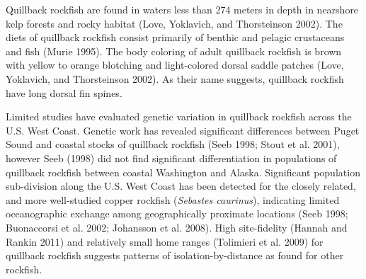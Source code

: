\documentclass[11pt,
  english,
  a4paper,
]{article}
\begin{document}
\leavevmode\tagmcend\tagstructend\par


Quillback rockfish are found in waters less than 274 meters in depth in nearshore kelp forests and rocky habitat {(Love, Yoklavich, and Thorsteinson 2002)\leavevmode\tagmcend\tagstructend}. The diets of quillback rockfish consist primarily of benthic and pelagic crustaceans and fish {(Murie 1995)\leavevmode\tagmcend\tagstructend}. The body coloring of adult quillback rockfish is brown with yellow to orange blotching and light-colored dorsal saddle patches {(Love, Yoklavich, and Thorsteinson 2002)\leavevmode\tagmcend\tagstructend}. As their name suggests, quillback rockfish have long dorsal fin spines.

\leavevmode\tagmcend\tagstructend\par


Limited studies have evaluated genetic variation in quillback rockfish across the U.S. West Coast. Genetic work has revealed significant differences between Puget Sound and coastal stocks of quillback rockfish {(Seeb 1998; Stout et al. 2001)\leavevmode\tagmcend\tagstructend}, however Seeb {(1998)\leavevmode\tagmcend\tagstructend} did not find significant differentiation in populations of quillback rockfish between coastal Washington and Alaska. Significant population sub-division along the U.S. West Coast has been detected for the closely related, and more well-studied copper rockfish (\emph{Sebastes caurinus}), indicating limited oceanographic exchange among geographically proximate locations {(Seeb 1998; Buonaccorsi et al. 2002; Johansson et al. 2008)\leavevmode\tagmcend\tagstructend}. High site-fidelity {(Hannah and Rankin 2011)\leavevmode\tagmcend\tagstructend} and relatively small home ranges {(Tolimieri et al. 2009)\leavevmode\tagmcend\tagstructend} for quillback rockfish suggests patterns of isolation-by-distance as found for other rockfish.
\end{document}
